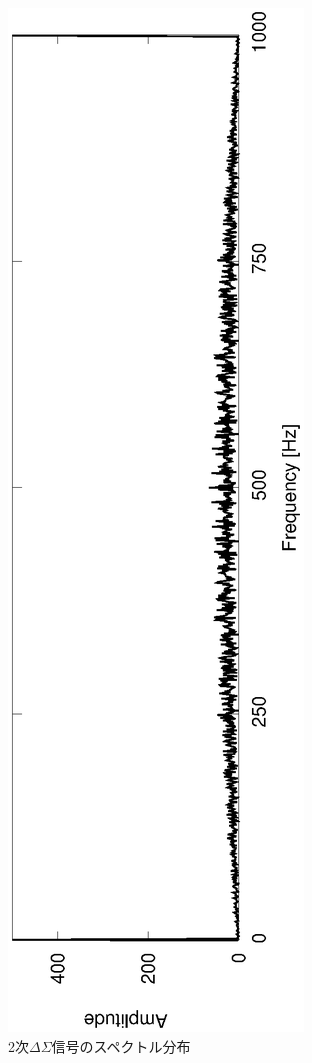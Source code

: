 \documentclass[a4j]{jsarticle}
\begin{document}
\begin{figure}[H]
 \centering
 \vspace{-4cm}
 \hspace{-2cm}
 \includegraphics[angle=-90,scale=0.6]{2ndout_spec.eps}
  \vspace{-2.2cm}
 \caption{2次$\Delta\Sigma$信号のスペクトル分布}
 \label{2nds}
\end{figure}
\end{document}
